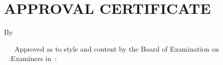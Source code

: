 
\chapter*{APPROVAL CERTIFICATE}

\parbox{\textwidth}{\centering\MakeUppercase{\thetitle}

\vspace{6pt}{\noindent\newline\theThesisType}

\vspace{6pt}By

\vspace{6pt}{\ifdefined\theStudyType\theauthor\else\authorswithroll\fi}
}

\noindent
{~~~Approved as to style and content by the %
\ifdefined\theStudyType Board of Examination on \theDefenseDay~\theDefenseDate\,:\else Examiners in \theDefenseDate\,:\fi
}


\vspace{\ifdefined\theStudyType 4ex \else 8ex\fi}


